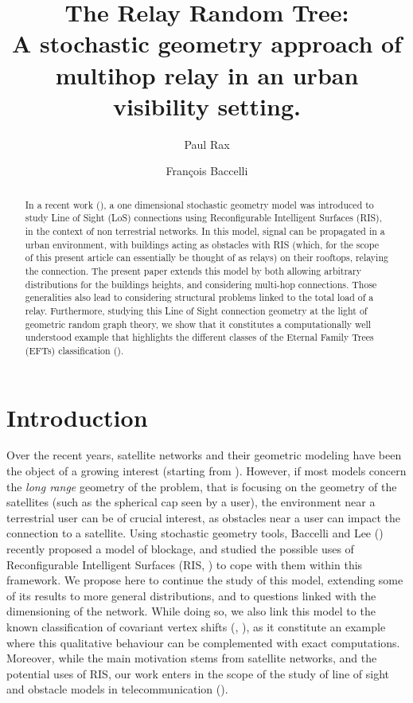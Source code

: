 \documentclass[10pt,english,a4paper]{smfart}
\author{Paul Rax}
\author{François Baccelli}
\title[The Relay Random Tree]{The Relay Random Tree:\\A stochastic geometry approach of multihop relay in an urban visibility setting.}
\theoremstyle{definition}
\theoremstyle{remark}
\begin{document}
\maketitle

\begin{abstract}
    In a recent work (\cite{Junse_Francois}), a one dimensional stochastic geometry model was introduced to study Line of Sight (LoS) connections using Reconfigurable Intelligent Surfaces (RIS), in the context of non terrestrial networks. In this model, signal can be propagated in a urban environment, with buildings acting as obstacles with RIS (which, for the scope of this present article can essentially be thought of as relays) on their rooftops, relaying the connection. The present paper extends this model by both allowing arbitrary distributions for the buildings heights, and considering multi-hop connections. Those generalities also lead to considering structural problems linked to the total load of a relay. Furthermore, studying this Line of Sight connection geometry at the light of geometric random graph theory, we show that it constitutes a computationally well understood example that highlights the different classes of the Eternal Family Trees (EFTs) classification (\cite{EFT}).
\end{abstract}
\tableofcontents
\section{Introduction}
Over the recent years, satellite networks and their geometric modeling have been the object of a growing interest (starting from \cite{okati_stochastic_2020}). However, if most models concern the \textit{long range} geometry of the problem, that is focusing on the geometry of the satellites (such as the spherical cap seen by a user), the environment near a terrestrial user can be of crucial interest, as obstacles near a user can impact the connection to a satellite. Using stochastic geometry tools, Baccelli and Lee (\cite{Junse_Francois}) recently proposed a model of blockage, and studied the possible uses of Reconfigurable Intelligent Surfaces (RIS, \cite{di_renzo_reconfigurable_2020}) to cope with them within this framework. We propose here to continue the study of this model, extending some of its results to more general distributions, and to questions linked with the dimensioning of the network. While doing so, we also link this model to the known classification of covariant vertex shifts (\cite{EFT}, \cite{CVPS}), as it constitute an example where this qualitative behaviour can be complemented with exact computations.
Moreover, while the main motivation stems from satellite networks, and the potential uses of RIS, our work enters in the scope of the study of line of sight and obstacle models in telecommunication (\cite{INFOCOM}).
\end{document}
